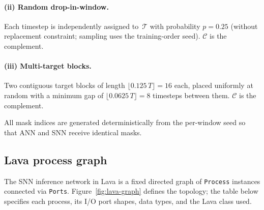 \documentclass[11pt,a4paper]{article}
\begin{document}
\paragraph{(ii) Random drop-in-window.}
Each timestep is independently assigned to~$\mathcal{T}$ with probability
$p=0.25$ (without replacement constraint; sampling uses the training-order
seed).  $\mathcal{C}$ is the complement.

\paragraph{(iii) Multi-target blocks.}
Two contiguous target blocks of length $\lfloor 0.125\,T \rfloor = 16$
each, placed uniformly at random with a minimum gap of $\lfloor 0.0625\,T
\rfloor = 8$ timesteps between them.  $\mathcal{C}$ is the complement.

All mask indices are generated deterministically from the per-window seed
so that ANN and SNN receive identical masks.

\subsection{Lava process graph}\label{sec:lava-graph}

The SNN inference network in Lava is a fixed directed graph of
\texttt{Process} instances connected via \texttt{Ports}.
Figure~\ref{fig:lava-graph} defines the topology; the table below
specifies each process, its I/O port shapes, data types, and the Lava
class used.
\end{document}
